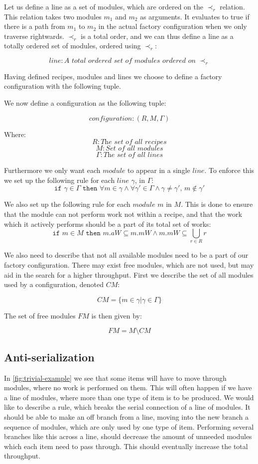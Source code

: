 Let us define a line as a set of modules, which are ordered on the $\prec_r$ relation. This relation takes two modules $m_1$ and $m_2$ as arguments. It evaluates to true if there is a path from $m_1$ to $m_2$ in the actual factory configuration when we only traverse rightwards. $\prec_r$ is a total order, and we can thus define a line as a totally ordered set of modules, ordered using $\prec_r$:

\[line: \textit{A total ordered set of modules ordered on } \prec_r\]

Having defined recipes, modules and lines we choose to define a factory configuration with the following tuple. 

We now define a configuration as the following tuple:

\[configuration: (R, M, \Gamma)\]

Where:
\[R: \textit{The set of all recipes}\]
\[M: \textit{Set of all modules}\]
\[\Gamma: \textit{The set of all lines}\]


Furthermore we only want each $module$ to appear in a single $line$. To enforce this we set up the following rule for each $line$ $\gamma$, in $\Gamma$:
\[\texttt{if } \gamma \in \Gamma \texttt{ then } \forall m \in \gamma \land \forall \gamma ' \in \Gamma \land \gamma \neq \gamma ',\, m \notin \gamma ' \]


We also set up the following rule for each $module$ $m$ in $M$. This is done to ensure that the module can not perform work not within a recipe, and that the work which it actively performs should be a part of its total set of works:
\[\texttt{if } m \in M \texttt{ then } m.aW \subseteq m.mW \land m.mW \subseteq  \bigcup_{r\in R}r\] 

We also need to describe that not all available modules need to be a part of our factory configuration. There may exist free modules, which are not used, but may aid in the search for a higher throughput. First we describe the set of all modules used by a configuration, denoted $CM$:

\[CM = \{m \in \gamma | \gamma \in \Gamma \}\]

The set of free modules $FM$ is then given by:

\[FM = M \setminus CM \]


\subsection{Anti-serialization}
In \cref{fig:trivial-example} we see that some items will have to move through modules, where no work is performed on them. This will often happen if we have a line of modules, where more than one type of item is to be produced. We would like to describe a rule, which breaks the serial connection of a line of modules. It should be able to make an off branch from a line, moving into the new branch a sequence of modules, which are only used by one type of item. Performing several branches like this across a line, should decrease the amount of unneeded modules which each item need to pass through. This should eventually increase the total throughput.

